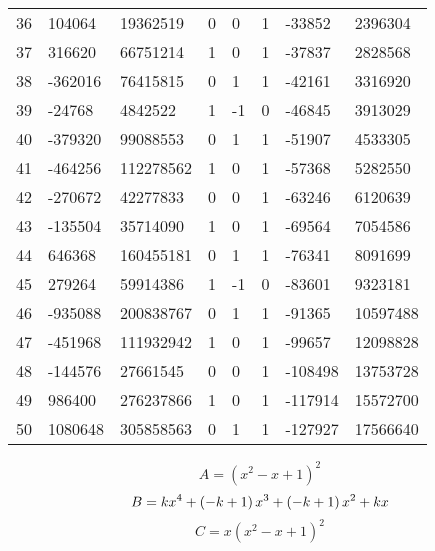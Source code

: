 \documentclass{amsart}
\begin{document}
\begin{longtable}{|l|l|l|lllll|}
36&104064&19362519&0&0&1&-33852&2396304\\
37&316620&66751214&1&0&1&-37837&2828568\\
38&-362016&76415815&0&1&1&-42161&3316920\\
39&-24768&4842522&1&-1&0&-46845&3913029\\
40&-379320&99088553&0&1&1&-51907&4533305\\
41&-464256&112278562&1&0&1&-57368&5282550\\
42&-270672&42277833&0&0&1&-63246&6120639\\
43&-135504&35714090&1&0&1&-69564&7054586\\
44&646368&160455181&0&1&1&-76341&8091699\\
45&279264&59914386&1&-1&0&-83601&9323181\\
46&-935088&200838767&0&1&1&-91365&10597488\\
47&-451968&111932942&1&0&1&-99657&12098828\\
48&-144576&27661545&0&0&1&-108498&13753728\\
49&986400&276237866&1&0&1&-117914&15572700\\
50&1080648&305858563&0&1&1&-127927&17566640\\
\hline
\end{longtable}
$$A=(x^2
 - x
 + 1)^{2}$$
$$B=k\*x^4
 + \left(-k
 + 1\right) \*x^3
 + \left(-k
 + 1\right) \*x^2
 + k\*x$$
$$C=x(x^2
 - x
 + 1)^{2}$$
\end{document}
